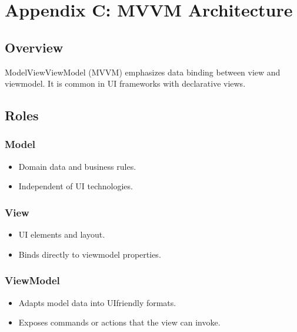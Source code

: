 \documentclass[letterpaper,10pt,english]{sphinxmanual}
\begin{document}
\chapter{Appendix C: MVVM Architecture}
\label{\detokenize{appendix_c_mvvm_architecture:appendix-c-mvvm-architecture}}\label{\detokenize{appendix_c_mvvm_architecture::doc}}

\section{Overview}
\label{\detokenize{appendix_c_mvvm_architecture:overview}}
\sphinxAtStartPar
Model\sphinxhyphen{}View\sphinxhyphen{}ViewModel (MVVM) emphasizes data binding between view and view\sphinxhyphen{}model.
It is common in UI frameworks with declarative views.


\section{Roles}
\label{\detokenize{appendix_c_mvvm_architecture:roles}}

\subsection{Model}
\label{\detokenize{appendix_c_mvvm_architecture:model}}\begin{itemize}
\item {} 
\sphinxAtStartPar
Domain data and business rules.

\item {} 
\sphinxAtStartPar
Independent of UI technologies.

\end{itemize}


\subsection{View}
\label{\detokenize{appendix_c_mvvm_architecture:view}}\begin{itemize}
\item {} 
\sphinxAtStartPar
UI elements and layout.

\item {} 
\sphinxAtStartPar
Binds directly to view\sphinxhyphen{}model properties.

\end{itemize}


\subsection{ViewModel}
\label{\detokenize{appendix_c_mvvm_architecture:viewmodel}}\begin{itemize}
\item {} 
\sphinxAtStartPar
Adapts model data into UI\sphinxhyphen{}friendly formats.

\item {} 
\sphinxAtStartPar
Exposes commands or actions that the view can invoke.

\end{itemize}
\end{document}
